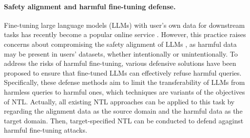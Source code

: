 \paragraph{Safety alignment and harmful fine-tuning defense.} 
Fine-tuning large language models (LLMs) with user's own data for downstream tasks has recently become a popular online service \cite{huang2024harmful,openai2024finetune}. However, this practice raises concerns about compromising the safety alignment of LLMs \cite{qi2023fine,yang2023shadow,zhan2023removing}, as harmful data may be present in users' datasets, whether intentionally or unintentionally. To address the risks of harmful fine-tuning, various defensive solutions \cite{huang2024booster,rosati2024representation,huang2024vaccine} have been proposed to ensure that fine-tuned LLMs can effectively refuse harmful queries. Specifically, these defense methods aim to limit the transferability of LLMs from harmless queries to harmful ones, which techniques are variants of the objectives of NTL. 
Actually, all existing NTL approaches can be applied to this task by regarding the alignment data as the source domain and the harmful data as the target domain. Then, target-specified NTL can be conducted to defend agaginst harmful fine-tuning attacks.

